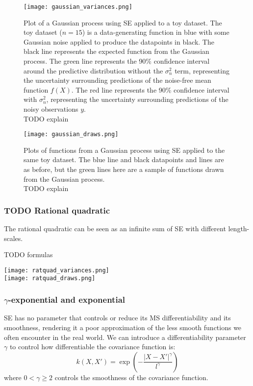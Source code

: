 \begin{figure}[H]
    \texttt{[image: gaussian\_variances.png]}
    \caption{
        Plot of a Gaussian process using SE applied to a toy dataset. The toy dataset ($n = 15$) is a data-generating function in blue with some Gaussian noise applied to produce the datapoints in black. The black line represents the expected function from the Gaussian process. The green line represents the 90\% confidence interval around the predictive distribution without the $\sigma^2_n$ term, representing the uncertainty surrounding predictions of the noise-free mean function $f(X)$. The red line represents the 90\% confidence interval with $\sigma^2_n$, representing the uncertainty surrounding predictions of the noisy observations $y$. \\
        TODO explain
    }
\end{figure}

\begin{figure}[H]
    \texttt{[image: gaussian\_draws.png]}
    \caption{
        Plots of functions from a Gaussian process using SE applied to the same toy dataset. The blue line and black datapoints and lines are as before, but the green lines here are a sample of functions drawn from the Gaussian process. \\
        TODO explain
    }
\end{figure}

\subsubsection{TODO Rational quadratic}
The rational quadratic can be seen as an infinite sum of SE with different length-scales.

TODO formulas

\texttt{[image: ratquad\_variances.png]} \\
\texttt{[image: ratquad\_draws.png]} \\


\subsubsection{$\gamma$-exponential and exponential}
SE has no parameter that controls or reduce its MS differentiability and its smoothness, rendering it a poor approximation of the less smooth functions we often encounter in the real world. We can introduce a differentiability parameter $\gamma$ to control how differentiable the covariance function is:
\begin{equation*}
    k(X,X') = \exp \left(-\frac{|X - X'|^{\gamma}}{l^{\gamma}} \right)
\end{equation*}
where $0 < \gamma \geq 2$ controls the smoothness of the covariance function. 

